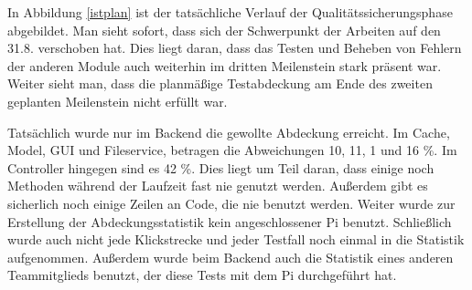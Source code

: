 \documentclass[parskip=full]{scrartcl}
\begin{document}
In Abbildung \ref{istplan} ist der tatsächliche Verlauf der Qualitätssicherungsphase abgebildet. Man sieht sofort, dass sich der Schwerpunkt der Arbeiten auf den 31.8. verschoben hat. Dies liegt daran, dass das Testen und Beheben von Fehlern der anderen Module auch weiterhin im dritten Meilenstein stark präsent war. Weiter sieht man, dass die planmäßige Testabdeckung am Ende des zweiten geplanten Meilenstein nicht erfüllt war.  

Tatsächlich wurde nur im Backend die gewollte Abdeckung erreicht. Im Cache, Model, GUI und Fileservice, betragen die Abweichungen 10, 11, 1 und 16 \%. Im Controller hingegen sind es 42 \%. Dies liegt um Teil daran, dass einige noch Methoden während der Laufzeit fast nie genutzt werden. Außerdem gibt es sicherlich noch einige Zeilen an Code, die nie benutzt werden. Weiter wurde zur Erstellung der Abdeckungsstatistik kein angeschlossener Pi benutzt. Schließlich wurde auch nicht jede Klickstrecke und jeder Testfall noch einmal in die Statistik aufgenommen. Außerdem wurde beim Backend auch die Statistik eines anderen Teammitglieds benutzt, der diese Tests mit dem Pi durchgeführt hat. 
\end{document}
